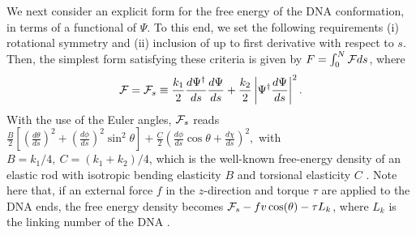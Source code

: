 \documentclass[pre,showpacs,twocolumn,superscriptaddress]{revtex4}
\newcommand{\cF}{ {\cal F} }
\begin{document}
We next consider an explicit form for the free energy of the DNA conformation,
in terms of a functional of $\Psi$.
To this end,
we set the following requirements
(i) rotational symmetry and
(ii) inclusion of up to first derivative with respect to $s$.
Then, 
the simplest form satisfying these criteria is given by 
$F= \int_0^N  \cF  ds$,
where
\begin{equation}
\cF=\cF_s \equiv
\frac{k_1}{2} \frac{d\Psi^{\dagger}}{ds}\frac{d\Psi}{ds} 
+   \frac{k_2}{2}
 \left|  \Psi^{\dagger}\frac{d\Psi}{ds} \right|^2. 
\label{Lrod}
\end{equation}
With the use of the Euler angles,
$\cF_s$ 
reads
$
   \frac{B}{2}[(\frac{d\theta}{ds})^2 +(\frac{d \phi}{ds})^2 \sin^2\theta]
   +\frac{C}{2} (\frac{d \phi}{ds}\cos \theta +\frac{d \chi}{ds} ) ^2,
$
with $B=k_1/4,\ C=(k_1+k_2)/4$,
which is the well-known free-energy density of an elastic rod with isotropic bending 
elasticity $B$ and torsional elasticity $C$ \cite{LLelastic}.
Note here that, if an external force $f$ in the  $z$-direction and torque $\tau$ are 
applied to the DNA ends, the free energy density becomes
$ \cF_s-f v \cos (\theta) -\tau L_k$,
where $L_k$ is the linking number of the DNA \cite{MarkoSiggia}.
\end{document}
